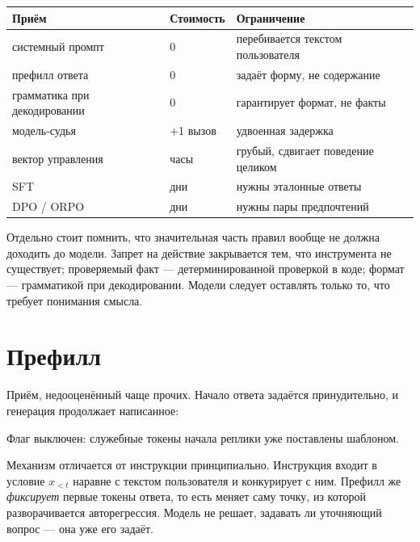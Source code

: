 \documentclass[11pt,a4paper]{article}
\begin{document}
\begin{center}
\begin{tabular}{@{}llp{6.6cm}@{}}
\toprule
\textbf{Приём} & \textbf{Стоимость} & \textbf{Ограничение} \\
\midrule
системный промпт & 0 & перебивается текстом пользователя \\
префилл ответа & 0 & задаёт форму, не содержание \\
грамматика при декодировании & 0 & гарантирует формат, не факты \\
модель-судья & +1 вызов & удвоенная задержка \\
вектор управления & часы & грубый, сдвигает поведение целиком \\
SFT & дни & нужны эталонные ответы \\
DPO / ORPO & дни & нужны пары предпочтений \\
\bottomrule
\end{tabular}
\end{center}

Отдельно стоит помнить, что значительная часть правил вообще
не должна доходить до модели. Запрет на действие закрывается тем, что
инструмента не существует; проверяемый факт — детерминированной
проверкой в коде; формат — грамматикой при декодировании. Модели следует
оставлять только то, что требует понимания смысла.

\section{Префилл}

Приём, недооценённый чаще прочих. Начало ответа задаётся принудительно,
и генерация продолжает написанное:

\begin{quote}
\end{quote}

Флаг выключен: служебные токены начала реплики уже поставлены шаблоном.

Механизм отличается от инструкции принципиально. Инструкция входит
в условие $x_{<t}$ наравне с текстом пользователя и конкурирует с ним.
Префилл же \emph{фиксирует} первые токены ответа, то есть меняет саму
точку, из которой разворачивается авторегрессия. Модель не решает,
задавать ли уточняющий вопрос — она уже его задаёт.
\end{document}
